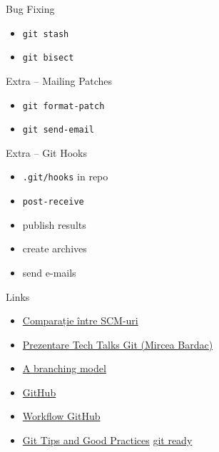 \documentclass{beamer}
\begin{document}
\begin{frame}{Bug Fixing}
  \begin{itemize}
    \item \texttt{git stash}
    \item \texttt{git bisect}
  \end{itemize}
\end{frame}

\begin{frame}{Extra -- Mailing Patches}
  \begin{itemize}
    \item \texttt{git format-patch}
    \item \texttt{git send-email}
  \end{itemize}
\end{frame}

\begin{frame}{Extra -- Git Hooks}
  \begin{itemize}
    \item \texttt{.git/hooks} in repo
    \item \texttt{post-receive}
    \item publish results
    \item create archives
    \item send e-mails
  \end{itemize}
\end{frame}

\begin{frame}[label=l]{Links}
  \begin{itemize}
    \item \href{http://en.wikipedia.org/wiki/Comparison_of_revision_control_software}{Comparație între SCM-uri}
    \item \href{http://talks.rosedu.org/prezentari/prezentarea03}{Prezentare
    Tech Talks Git (Mircea Bardac)}
    \item \href{http://nvie.com/posts/a-successful-git-branching-model/}{A
    branching model}
    \item \href{http://github.com}{GitHub}
    \item
    \href{http://www.eqqon.com/index.php/Collaborative_Github_Workflow}{Workflow
    GitHub}
    \item
    \href{http://techblog.rosedu.org/git-good-practices.html}{Git Tips and
    Good Practices}
    \href{http://gitready.com/}{git ready}
  \end{itemize}
\end{frame}
\end{document}
